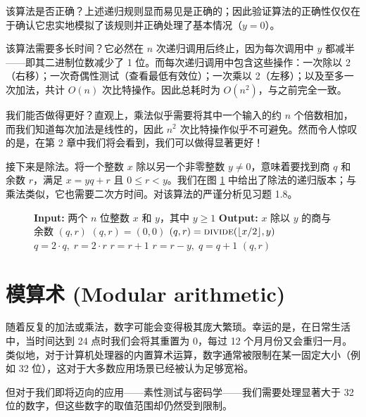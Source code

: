 该算法是否正确？上述递归规则显而易见是正确的；因此验证算法的正确性仅仅在于确认它忠实地模拟了该规则并正确处理了基本情况（$y = 0$）。

该算法需要多长时间？它必然在 $n$ 次递归调用后终止，因为每次调用中 $y$ 都减半——即其二进制位数减少了 1 位。而每次递归调用中包含这些操作：一次除以 2（右移）；一次奇偶性测试（查看最低有效位）；一次乘以 2（左移）；以及至多一次加法，共计 $O(n)$ 次比特操作。因此总耗时为 $O(n^2)$，与之前完全一致。

我们能否做得更好？直观上，乘法似乎需要将其中一个输入的约 $n$ 个倍数相加，而我们知道每次加法是线性的，因此 $n^2$ 次比特操作似乎不可避免。然而令人惊叹的是，在第 2 章中我们将会看到，我们可以做得显著更好！

接下来是除法。将一个整数 $x$ 除以另一个非零整数 $y \ne 0$，意味着要找到商 $q$ 和余数 $r$，满足 $x = yq + r$ 且 $0 \le r < y$。我们在图 \ref{fig:div_recursive} 中给出了除法的递归版本；与乘法类似，它也需要二次方时间。对该算法的严谨分析见习题 1.8。

\begin{figure}[htbp]
\centering
\begin{tcolorbox}[colback=white,colframe=gray!50!black,title={\textbf{图 1.2}\quad 除法 (Division)}]
\begin{algorithmic}[1]
    \State \textbf{Input:} 两个 $n$ 位整数 $x$ 和 $y$，其中 $y \ge 1$
    \State \textbf{Output:} $x$ 除以 $y$ 的商与余数 $(q, r)$
     \Return $(q, r) = (0, 0)$ \EndIf
    \State $(q, r) = \Call{divide}{\lfloor x/2 \rfloor, y}$
    \State $q = 2 \cdot q,\; r = 2 \cdot r$
     $r = r + 1$ \EndIf
     $r = r - y,\; q = q + 1$ \EndIf
    \State \Return $(q, r)$
\EndFunction
\end{algorithmic}
\end{tcolorbox}
\label{fig:div_recursive}
\end{figure}

\section{模算术 (Modular arithmetic)}

随着反复的加法或乘法，数字可能会变得极其庞大繁琐。幸运的是，在日常生活中，当时间达到 24 点时我们会将其重置为 0，每过 12 个月月份又会重归一月。类似地，对于计算机处理器的内置算术运算，数字通常被限制在某一固定大小（例如 32 位），这对于大多数应用场景已经被认为足够宽裕。

但对于我们即将迈向的应用——素性测试与密码学——我们需要处理显著大于 32 位的数字，但这些数字的取值范围却仍然受到限制。

